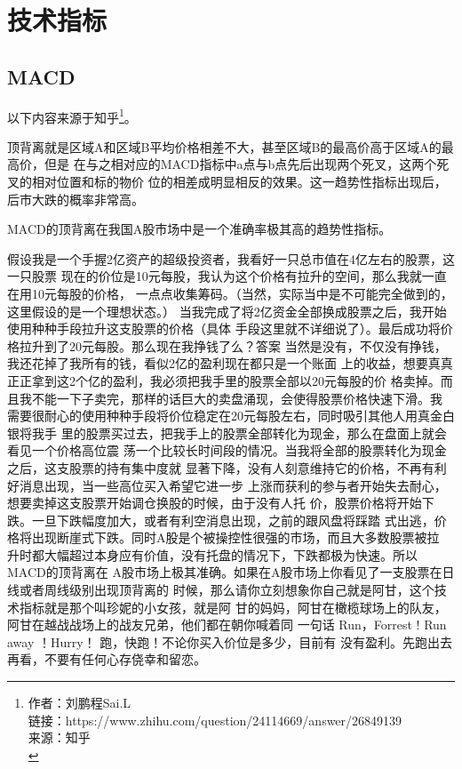 \chapter{技术指标}


\section{MACD}


以下内容来源于知乎\footnote{
作者：刘鹏程Sai.L \\
链接：https://www.zhihu.com/question/24114669/answer/26849139 \\
来源：知乎 \\
}。

顶背离就是区域A和区域B平均价格相差不大，甚至区域B的最高价高于区域A的最高价，但是
在与之相对应的MACD指标中a点与b点先后出现两个死叉，这两个死叉的相对位置和标的物价
位的相差成明显相反的效果。这一趋势性指标出现后，后市大跌的概率非常高。

{\color{red} MACD的顶背离在我国A股市场中是一个准确率极其高的趋势性指标。}



假设我是一个手握2亿资产的超级投资者，我看好一只总市值在4亿左右的股票，这一只股票
现在的价位是10元每股，我认为这个价格有拉升的空间，那么我就一直在用10元每股的价格，
一点点收集筹码。（当然，实际当中是不可能完全做到的，这里假设的是一个理想状态。）
当我完成了将2亿资金全部换成股票之后，我开始使用种种手段拉升这支股票的价格（具体
手段这里就不详细说了）。最后成功将价格拉升到了20元每股。那么现在我挣钱了么？答案
当然是没有，不仅没有挣钱，我还花掉了我所有的钱，看似2亿的盈利现在都只是一个账面
上的收益，想要真真正正拿到这2个亿的盈利，我必须把我手里的股票全部以20元每股的价
格卖掉。而且我不能一下子卖完，那样的话巨大的卖盘涌现，会使得股票价格快速下滑。我
需要很耐心的使用种种手段将价位稳定在20元每股左右，同时吸引其他人用真金白银将我手
里的股票买过去，把我手上的股票全部转化为现金，那么在盘面上就会看见一个价格高位震
荡一个比较长时间段的情况。当我将全部的股票转化为现金之后，这支股票的持有集中度就
显著下降，没有人刻意维持它的价格，不再有利好消息出现，当一些高位买入希望它进一步
上涨而获利的参与者开始失去耐心，想要卖掉这支股票开始调仓换股的时候，由于没有人托
价，股票价格将开始下跌。一旦下跌幅度加大，或者有利空消息出现，之前的跟风盘将踩踏
式出逃，价格将出现断崖式下跌。同时A股是个被操控性很强的市场，而且大多数股票被拉
升时都大幅超过本身应有价值，没有托盘的情况下，下跌都极为快速。所以MACD的顶背离在
A股市场上极其准确。如果在A股市场上你看见了一支股票在日线或者周线级别出现顶背离的
时候，那么请你立刻想象你自己就是阿甘，这个技术指标就是那个叫珍妮的小女孩，就是阿
甘的妈妈，阿甘在橄榄球场上的队友，阿甘在越战战场上的战友兄弟，他们都在朝你喊着同
一句话 Run，Forrest ! Run away ！Hurry！ 跑，快跑！不论你买入价位是多少，目前有
没有盈利。先跑出去再看，不要有任何心存侥幸和留恋。

